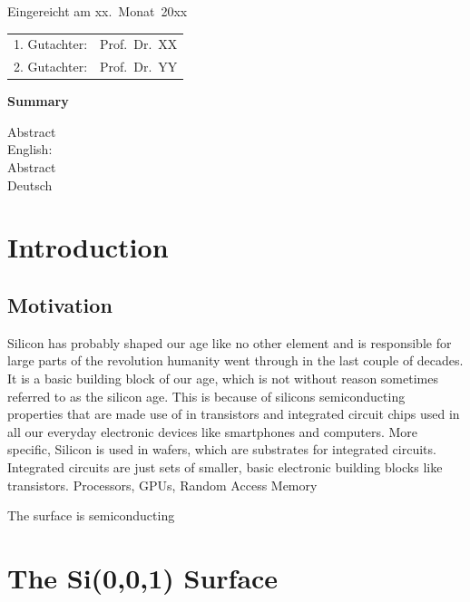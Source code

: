 \thispagestyle{empty}\vspace*{48em}

Eingereicht am xx.~Monat~20xx\vspace{1.5em}
\par{\large\begin{tabular}{ll}
 1. Gutachter: & Prof.~Dr.~XX \\
 2. Gutachter: & Prof.~Dr.~YY \\
\end{tabular}}


\newpage
\begin{center}\large\bfseries Summary\end{center}


Abstract \\ 
English: \\

\vspace{20em}
Abstract \\ 
Deutsch \\
 
 

\tableofcontents



\mainmatter
\chapter{Introduction}
\section{Motivation}
		Silicon has probably shaped our age like no other element and is responsible for large parts of the revolution humanity went through in the last couple of decades. It is a basic building block of our age, which is not without reason sometimes referred to as the silicon age. This is because of silicons semiconducting properties that are made use of in transistors and integrated circuit chips used in all our everyday electronic devices like smartphones and computers. More specific, Silicon is used in wafers, which are substrates for integrated circuits. Integrated circuits are just sets of smaller, basic electronic building blocks like transistors. Processors, GPUs, Random Access Memory 
	
	The surface is semiconducting \cite{himpsel1979photoemission, uhrberg1981experimental, handa1989plasma}


\chapter{The Si(0,0,1) Surface} \label{Section::Silicon}
